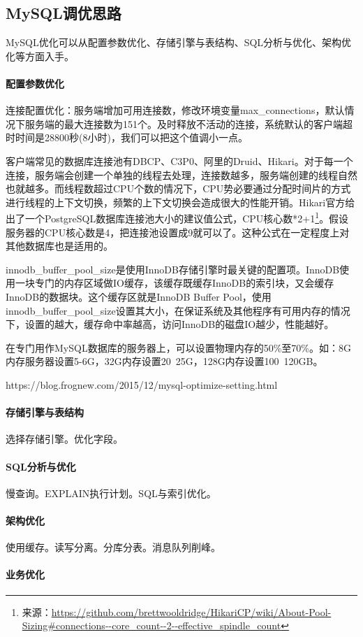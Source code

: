 \documentclass[../../../interview-questions.tex]{subfiles}
\begin{document}
\subsection{MySQL调优思路}

MySQL优化可以从配置参数优化、存储引擎与表结构、SQL分析与优化、架构优化等方面入手。

\paragraph{配置参数优化}

连接配置优化：服务端增加可用连接数，修改环境变量max\_connections，默认情况下服务端的最大连接数为151个。及时释放不活动的连接，系统默认的客户端超时时间是28800秒(8小时)，我们可以把这个值调小一点。

客户端常见的数据库连接池有DBCP、C3P0、阿里的Druid、Hikari。对于每一个连接，服务端会创建一个单独的线程去处理，连接数越多，服务端创建的线程自然也就越多。而线程数超过CPU个数的情况下，CPU势必要通过分配时间片的方式进行线程的上下文切换，频繁的上下文切换会造成很大的性能开销。Hikari官方给出了一个PostgreSQL数据库连接池大小的建议值公式，CPU核心数*2+1\footnote{来源：\url{https://github.com/brettwooldridge/HikariCP/wiki/About-Pool-Sizing\#connections--core_count--2--effective_spindle_count}}。假设服务器的CPU核心数是4，把连接池设置成9就可以了。这种公式在一定程度上对其他数据库也是适用的。

innodb\_buffer\_pool\_size是使用InnoDB存储引擎时最关键的配置项。InnoDB使用一块专门的内存区域做IO缓存，该缓存既缓存InnoDB的索引块，又会缓存InnoDB的数据块。这个缓存区就是InnoDB Buffer Pool，使用innodb\_buffer\_pool\_size设置其大小，在保证系统及其他程序有可用内存的情况下，设置的越大，缓存命中率越高，访问InnoDB的磁盘IO越少，性能越好。

在专门用作MySQL数据库的服务器上，可以设置物理内存的50\%至70\%。如：8G内存服务器设置5-6G，32G内存设置20~25G，128G内存设置100~120GB。

https://blog.frognew.com/2015/12/mysql-optimize-setting.html

\paragraph{存储引擎与表结构}

选择存储引擎。优化字段。

\paragraph{SQL分析与优化}

慢查询。EXPLAIN执行计划。SQL与索引优化。

\paragraph{架构优化}

使用缓存。读写分离。分库分表。消息队列削峰。

\paragraph{业务优化}
\end{document}
